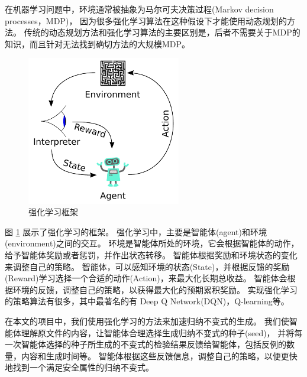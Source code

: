 在机器学习问题中，环境通常被抽象为马尔可夫决策过程(Markov decision processes，MDP)\cite{markov}，
因为很多强化学习算法在这种假设下才能使用动态规划的方法。
传统的动态规划方法和强化学习算法的主要区别是，后者不需要关于MDP的知识，而且针对无法找到确切方法的大规模MDP。

\begin{figure}[h]
    \centering
    \includegraphics[width=0.6\textwidth]{figures/Reinforcement_learning_diagram.pdf}
    \caption{强化学习框架}
    \label{fig:rl}
\end{figure}
图 \ref{fig:rl} 展示了强化学习的框架。
强化学习中，主要是智能体(agent)和环境(environment)之间的交互。
环境是智能体所处的环境，它会根据智能体的动作，给予智能体奖励或者惩罚，并作出状态转移。
智能体根据奖励和环境状态的变化来调整自己的策略。
智能体，可以感知环境的状态(State)，并根据反馈的奖励(Reward)学习选择一个合适的动作(Action)，来最大化长期总收益。
智能体会根据环境的反馈，调整自己的策略，以获得最大化的预期累积奖励。
实现强化学习的策略算法有很多，其中最著名的有 Deep Q Network(DQN)\cite{dqn}，Q-learning\cite{q-learning}等。

在本文的项目中，我们使用强化学习的方法来加速归纳不变式的生成。
我们使智能体理解\TLA 原文件的内容，让智能体合理选择生成归纳不变式的种子(seed)，
并将每一次智能体选择的种子所生成的不变式的检验结果反馈给智能体，包括反例的数量，内容和生成时间等。
智能体根据这些反馈信息，调整自己的策略，以便更快地找到一个满足安全属性的归纳不变式。


